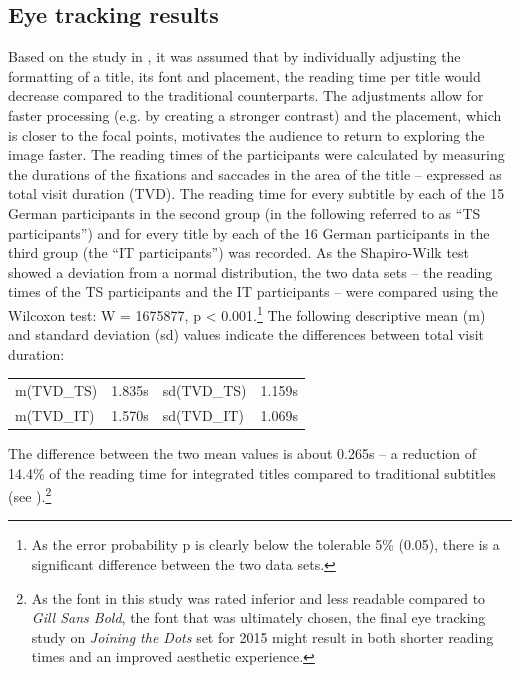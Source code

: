 \documentclass[output=paper]{langsci/langscibook}
\begin{document}
\subsection{Eye tracking results\label{sec:EyeTrackingResults}}

Based on the study in \citet{fox2012}, it was assumed that by individually adjusting the formatting of a title, its font and placement, the reading time per title would decrease compared to the traditional counterparts. The adjustments allow for faster processing (e.g. by creating a stronger contrast) and the placement, which is closer to the focal points, motivates the audience to return to exploring the image faster. The reading times of the participants were calculated by measuring the durations of the fixations and saccades in the area of the title -- expressed as total visit duration (TVD). The reading time for every subtitle by each of the 15 German participants in the second group (in the following referred to as ``TS participants'') and for every title by each of the 16 German participants in the third group (the ``IT participants'') was recorded. As the Shapiro-Wilk test showed a deviation from a normal distribution, the two data sets -- the reading times of the TS participants and the IT participants -- were compared using the Wilcoxon test: W = 1675877, p {\textless} 0.001.\footnote{As the error probability p is clearly below the tolerable 5\% (0.05), there is a significant difference between the two data sets.} The following descriptive mean (m) and standard deviation (sd) values indicate the differences between total visit duration:

\ea
\begin{tabular}{l@{=}rl@{=}r}

m(TVD\_TS) & 1.835s & sd(TVD\_TS) & 1.159s\\

m(TVD\_IT) & 1.570s & sd(TVD\_IT) & 1.069s
\end{tabular}
\z



The difference between the two mean values is about 0.265s -- a reduction of 14.4\% of the reading time for integrated titles compared to traditional subtitles (see ).\footnote{As the font in this study was rated inferior and less readable compared to \textit{Gill Sans Bold}, the font that was ultimately chosen, the final eye tracking study on \textit{Joining the Dots} set for 2015 might result in both shorter reading times and an improved aesthetic experience.}
\end{document}
